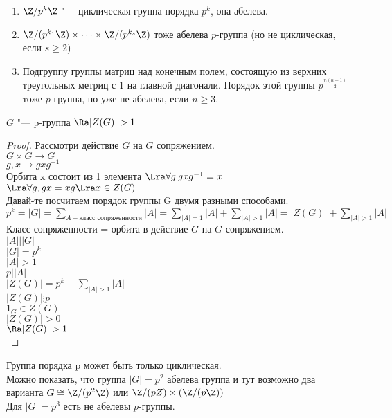 \begin{exmp}
\begin{enumerate}
\item $\Z/{p^{k}\Z}$  "--- циклическая группа порядка $p^k$, она абелева.\\
\item $\Z/(p^{k_1}\Z) \times \cdots \times \Z/(p^{k_s}\Z)$ тоже абелева $p$-группа (но не циклическая, если $s \ge 2$)\\
\item Подгруппу группы матриц над конечным полем, состоящую из верхних треугольных метриц
с 1 на главной диагонали.  Порядок этой группы $p^\frac{n(n - 1)}{2}$ тоже $p$-группа, но уже не абелева,
если $n \ge 3$.
\end{enumerate}
\end{exmp}
\begin{theorem}
$G$ "--- p-группа $\Ra |Z(G)| > 1$\\
\end{theorem}
\begin{proof}
Рассмотри действие $G$ на $G$ сопряжением.\\
$G \times G \to G$\\
$g, x \to g x g^{-1}$\\

Орбита x состоит из 1 элемента $\Lra \forall g \: g x g^{-1} = x$\\
$\Lra \forall g, gx = xg \Lra x \in Z(G)$\\

Давай-те посчитаем порядок группы G двумя разными способами.\\
$p^{k} = |G| = \sum_{A - \text{класс сопряженности}}|A| = \sum_{|A| = 1}|A| + \sum_{|A| > 1}|A| = |Z(G)| + \sum_{|A| > 1}|A|$\\

Класс сопряженности = орбита в действие $G$ на $G$ сопряжением. \\
$|A| | |G|$  \\
$|G| = p^{k}$\\
$|A| > 1$ \\
$p | |A|$\\
$|Z(G)| = p^{k} - \sum_{|A| > 1}|A|$\\
$|Z(G)| \vdots p$\\
$1_{G} \in Z(G)$ \\
$|Z(G)| > 0$\\
$\Ra |Z(G)| > 1$\\
\end{proof}

Группа порядка p может быть только циклическая.\\ 
Можно показать, что группа $|G| = p^2$ абелева группа и тут возможно два варианта
$G \cong \Z/(p^2\Z)$ или $\Z/(pZ) \times (\Z/(p\Z))$ \\

Для $|G|= p^3$ есть не абелевы $p$-группы.
